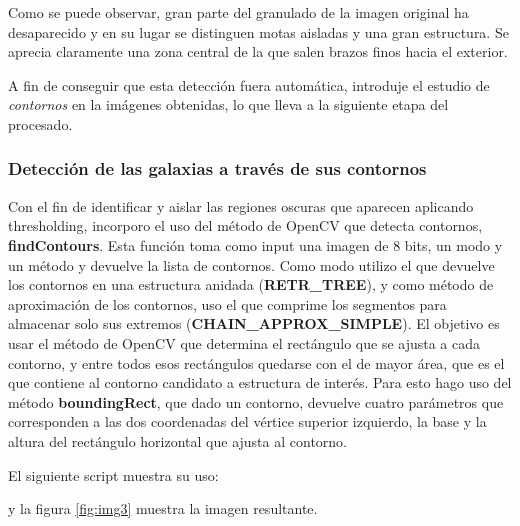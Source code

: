 \documentclass[a4paper,12pt]{article}
\begin{document}
Como se puede observar, gran parte del granulado de la imagen original ha desaparecido y en su lugar se distinguen motas aisladas y una gran estructura. Se aprecia claramente una zona central de la que salen brazos finos hacia el exterior.

A fin de conseguir que esta detección fuera automática, introduje el estudio de \textit{contornos} en la imágenes obtenidas, lo que lleva a la siguiente etapa del procesado.

\subsubsection{Detección de las galaxias a través de sus contornos}
Con el fin de identificar y aislar las regiones oscuras que aparecen aplicando thresholding, incorporo el uso del método de OpenCV que detecta contornos, \textbf{findContours}\cite{findcontours}. Esta función toma como input una imagen de 8 bits, un modo y un método y devuelve la lista de contornos. Como modo utilizo el que devuelve los contornos en una estructura anidada (\textbf{RETR\_TREE}), y como método de aproximación de los contornos, uso el que comprime los segmentos para almacenar solo sus extremos (\textbf{CHAIN\_APPROX\_SIMPLE}). El objetivo es usar el método de OpenCV que determina el rectángulo que se ajusta a cada contorno, y entre todos esos rectángulos quedarse con el de mayor área, que es el que contiene al contorno candidato a estructura de interés. Para esto hago uso del método \textbf{boundingRect}\cite{boundingrect}, que dado un contorno, devuelve cuatro parámetros que corresponden a las dos coordenadas del vértice superior izquierdo, la base y la altura del rectángulo horizontal que ajusta al contorno.


El siguiente script muestra su uso:

y la figura \ref{fig:img3} muestra la imagen resultante.
\end{document}
